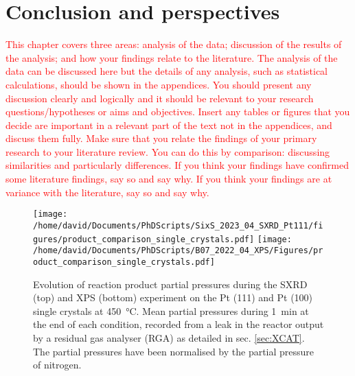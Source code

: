 \section{Conclusion and perspectives}

\textcolor{red}{This chapter covers three areas: analysis of the data; discussion of the results of the analysis; and how your findings relate to the literature. The analysis of the data can be discussed here but the details of any analysis, such as statistical calculations, should be shown in the appendices. You should present any discussion clearly and logically and it should be relevant to your research questions/hypotheses or aims and objectives. Insert any tables or figures that you decide are important in a relevant part of the text not in the appendices, and discuss them fully. Make sure that you relate the findings of your primary research to your literature review. You can do this by comparison: discussing similarities and particularly differences. If you think your findings have confirmed some literature findings, say so and say why. If you think your findings are at variance with the literature, say so and say why.}





\begin{figure}[!htb]
    \centering
    \texttt{[image: /home/david/Documents/PhDScripts/SixS\_2023\_04\_SXRD\_Pt111/figures/product\_comparison\_single\_crystals.pdf]}
    \texttt{[image: /home/david/Documents/PhDScripts/B07\_2022\_04\_XPS/Figures/product\_comparison\_single\_crystals.pdf]}
    \caption{
        Evolution of reaction product partial pressures during the SXRD (top) and XPS (bottom) experiment on the Pt (111) and Pt (100) single crystals at \qty{450}{\degreeCelsius}.
        Mean partial pressures during \qty{1}{\minute} at the end of each condition, recorded from a leak in the reactor output by a residual gas analyser (RGA) as detailed in sec. \ref{sec:XCAT}.
        The partial pressures have been normalised by the partial pressure of nitrogen.
    }
    \label{fig:RGA450Pt111AndPt100}
\end{figure}

